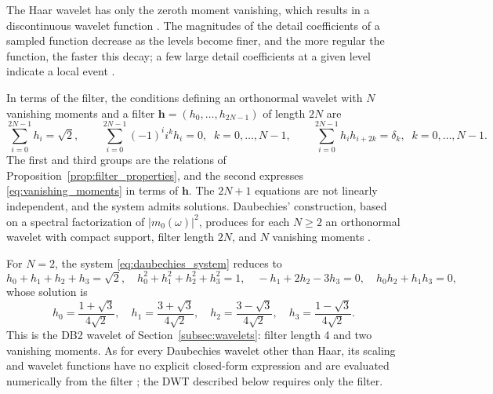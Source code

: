 The Haar wavelet has only the zeroth moment vanishing, which results in a
discontinuous wavelet function \cite[Sec.~3.5.1]{vidakovic1999}. The
magnitudes of the detail coefficients of a sampled function decrease as the
levels become finer, and the more regular the function, the faster this
decay; a few large detail coefficients at a given level indicate a local
event \cite[Sec.~4.1]{vidakovic1999}.

In terms of the filter, the conditions defining an orthonormal wavelet with
$N$ vanishing moments and a filter $\mathbf{h} = (h_0,\dots,h_{2N-1})$ of
length $2N$ are \cite[Sec.~3.5.5]{vidakovic1999}
\begin{equation}
\sum_{i=0}^{2N-1}h_i = \sqrt{2},\qquad
\sum_{i=0}^{2N-1}(-1)^ii^kh_i = 0,\;\; k = 0,\dots,N-1,\qquad
\sum_{i=0}^{2N-1}h_ih_{i+2k} = \delta_k,\;\; k = 0,\dots,N-1.
\label{eq:daubechies_system}
\end{equation}
The first and third groups are the relations of
Proposition~\ref{prop:filter_properties}, and the second expresses
\eqref{eq:vanishing_moments} in terms of $\mathbf{h}$. The $2N+1$ equations
are not linearly independent, and the system admits solutions.
Daubechies' construction, based on a spectral factorization of
$|m_0(\omega)|^2$, produces for each $N\geq 2$ an orthonormal wavelet with compact support,
filter length $2N$, and $N$ vanishing moments
\cite[Sec.~3.4.5]{vidakovic1999}.

\begin{example}[Daubechies wavelet with $N = 2$ {\cite[Ex.~3.5.3]{vidakovic1999}}]
\label{ex:db2}
For $N = 2$, the system \eqref{eq:daubechies_system} reduces to
\begin{equation*}
h_0+h_1+h_2+h_3 = \sqrt{2},\quad h_0^2+h_1^2+h_2^2+h_3^2 = 1,\quad
-h_1+2h_2-3h_3 = 0,\quad h_0h_2+h_1h_3 = 0,
\end{equation*}
whose solution is
\begin{equation*}
h_0 = \frac{1+\sqrt{3}}{4\sqrt{2}},\quad h_1 = \frac{3+\sqrt{3}}{4\sqrt{2}},
\quad h_2 = \frac{3-\sqrt{3}}{4\sqrt{2}},\quad
h_3 = \frac{1-\sqrt{3}}{4\sqrt{2}}.
\end{equation*}
This is the DB2 wavelet of Section~\ref{subsec:wavelets}: filter length 4 and
two vanishing moments. As for every Daubechies wavelet other than Haar, its
scaling and wavelet functions have no explicit closed-form expression and
are evaluated numerically from the filter \cite[Sec.~3.5.4]{vidakovic1999};
the DWT described below requires only the filter.
\end{example}

